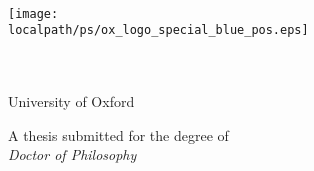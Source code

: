\begin{titlepage}
\begin{center}



{\Huge \bf
\xtitle}\\


\vspace{2.2cm}

\texttt{[image: \\localpath/ps/ox\_logo\_special\_blue\_pos.eps]}

%
\vspace{1cm}

{\Large 
\xauthor\\
\large \xcollege\\
\large University of Oxford
}
\vspace*{1cm}
\begin{center}
\vspace{1cm}
{
\large A thesis submitted for the degree of \\
\textit{Doctor of Philosophy} \\
{ \xterm}
}

\end{center}

%
%
%

%
\end{center}
\end{titlepage}

